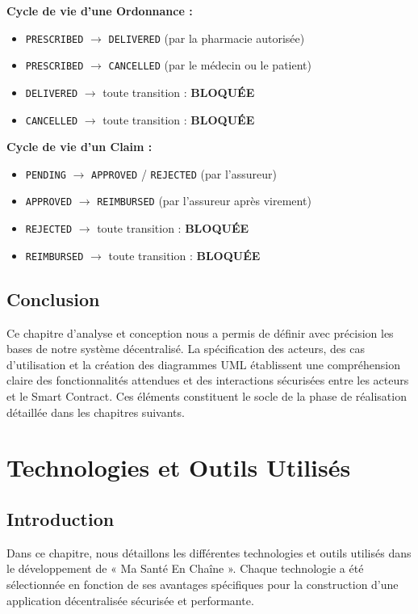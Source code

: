 \documentclass[12pt,a4paper]{report}
\begin{document}
\textbf{Cycle de vie d'une Ordonnance :}
\begin{itemize}
    \item \texttt{PRESCRIBED} $\rightarrow$ \texttt{DELIVERED} (par la pharmacie autorisée)
    \item \texttt{PRESCRIBED} $\rightarrow$ \texttt{CANCELLED} (par le médecin ou le patient)
    \item \texttt{DELIVERED} $\rightarrow$ toute transition : \textbf{BLOQUÉE}
    \item \texttt{CANCELLED} $\rightarrow$ toute transition : \textbf{BLOQUÉE}
\end{itemize}

\textbf{Cycle de vie d'un Claim :}
\begin{itemize}
    \item \texttt{PENDING} $\rightarrow$ \texttt{APPROVED} / \texttt{REJECTED} (par l'assureur)
    \item \texttt{APPROVED} $\rightarrow$ \texttt{REIMBURSED} (par l'assureur après virement)
    \item \texttt{REJECTED} $\rightarrow$ toute transition : \textbf{BLOQUÉE}
    \item \texttt{REIMBURSED} $\rightarrow$ toute transition : \textbf{BLOQUÉE}
\end{itemize}

\section{Conclusion}
Ce chapitre d'analyse et conception nous a permis de définir avec précision les bases de notre système décentralisé. La spécification des acteurs, des cas d'utilisation et la création des diagrammes UML établissent une compréhension claire des fonctionnalités attendues et des interactions sécurisées entre les acteurs et le Smart Contract. Ces éléments constituent le socle de la phase de réalisation détaillée dans les chapitres suivants.
\chapter{Technologies et Outils Utilisés}

\section{Introduction}
Dans ce chapitre, nous détaillons les différentes technologies et outils utilisés dans le développement de « Ma Santé En Chaîne ». Chaque technologie a été sélectionnée en fonction de ses avantages spécifiques pour la construction d'une application décentralisée sécurisée et performante.
\end{document}
